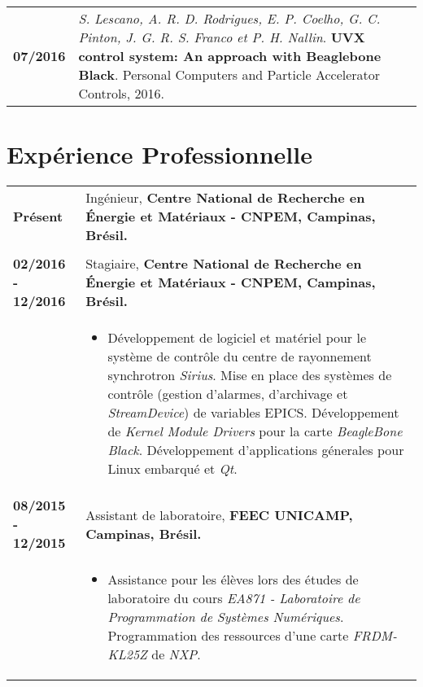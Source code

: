 \documentclass[10pt, a4paper]{article}
\begin{document}
\begin{tabular}{p{} p{}}

\textbf{07/2016}  & \textit{S. Lescano, A. R. D. Rodrigues, E. P.
Coelho, G. C. Pinton, J. G. R. S. Franco et P. H. Nallin}. \textbf{UVX
control system: An approach with Beaglebone Black}. Personal Computers and
Particle Accelerator Controls, 2016. \\

\end{tabular}


\section{Expérience Professionnelle}

\begin{tabular}{p{} p{}}

\textbf{Présent}  & Ingénieur, \textbf{Centre National de
Recherche en Énergie et Matériaux - CNPEM, Campinas, Brésil.}
\\
& \vspace{-8pt}
\\

\textbf{02/2016 - 12/2016}  & Stagiaire, \textbf{Centre National de
Recherche en Énergie et Matériaux - CNPEM, Campinas, Brésil.}
 \\
  & \vspace{-8pt}
  \begin{itemize}
    \item Développement de logiciel et matériel pour le système
    de contrôle du centre de rayonnement synchrotron \textit{Sirius}.
    Mise en place des systèmes de contrôle (gestion d'alarmes, d'archivage et
    \textit{StreamDevice}) de variables EPICS. Développement de \textit{Kernel Module Drivers} pour la
    carte \textit{BeagleBone Black}. Développement d'applications
    génerales pour Linux embarqué et \textit{Qt}.
    
	\end{itemize}\\

\textbf{08/2015 - 12/2015}  & Assistant de laboratoire, \textbf{FEEC
 UNICAMP, Campinas, Brésil.}
 \\
 & \vspace{-8pt}
 \begin{itemize}
    \item Assistance pour les élèves lors des études de
    laboratoire du cours \textit{EA871 - Laboratoire de Programmation de
    Systèmes Numériques}. Programmation des ressources 
    d'une carte \textit{FRDM-KL25Z} de \textit{NXP}.
    

\end{itemize}
\end{tabular}
\end{document}
